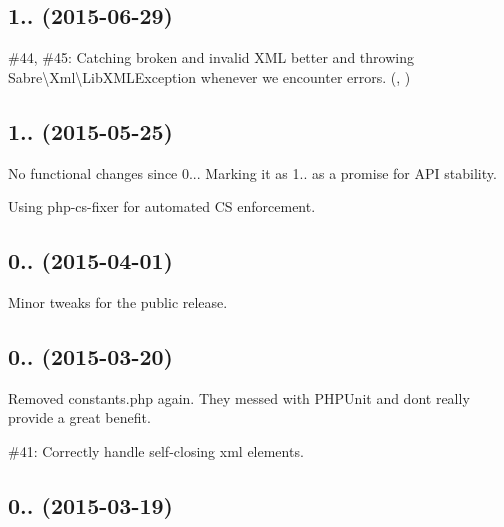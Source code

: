 \subsection*{1.. (2015-\/06-\/29) }


\begin{DoxyItemize}
\item \#44, \#45\+: Catching broken and invalid X\+ML better and throwing {\ttfamily Sabre\textbackslash{}Xml\textbackslash{}Lib\+X\+M\+L\+Exception} whenever we encounter errors. (, )
\end{DoxyItemize}

\subsection*{1.. (2015-\/05-\/25) }


\begin{DoxyItemize}
\item No functional changes since 0... Marking it as 1.. as a promise for A\+PI stability.
\item Using php-\/cs-\/fixer for automated CS enforcement.
\end{DoxyItemize}

\subsection*{0.. (2015-\/04-\/01) }


\begin{DoxyItemize}
\item Minor tweaks for the public release.
\end{DoxyItemize}

\subsection*{0.. (2015-\/03-\/20) }


\begin{DoxyItemize}
\item Removed {\ttfamily constants.\+php} again. They messed with P\+H\+P\+Unit and don\textquotesingle{}t really provide a great benefit.
\item \#41\+: Correctly handle self-\/closing xml elements.
\end{DoxyItemize}

\subsection*{0.. (2015-\/03-\/19) }


